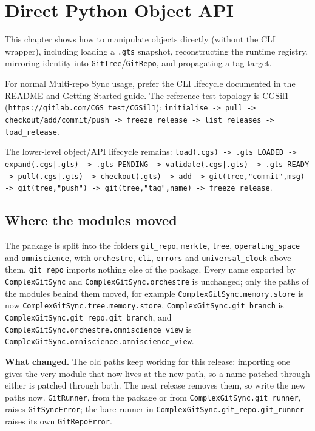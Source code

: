 
\chapter{Direct Python Object API}
\label{chap:python-api}

This chapter shows how to manipulate \cgspkg{} objects directly (without the
CLI wrapper), including loading a \texttt{.gts} snapshot, reconstructing the
runtime registry, mirroring identity into \texttt{GitTree}/\texttt{GitRepo},
and propagating a tag target.

For normal Multi-repo Sync usage, prefer the CLI lifecycle documented in the
README and Getting Started guide. The reference test topology is CGSil1
(\texttt{https://gitlab.com/CGS\_test/CGSil1}):
\texttt{initialise -> pull -> checkout/add/commit/push -> freeze\_release -> list\_releases -> load\_release}.

The lower-level object/API lifecycle remains:
\texttt{load(.cgs) -> .gts LOADED -> expand(.cgs|.gts) -> .gts PENDING ->
validate(.cgs|.gts) -> .gts READY -> pull(.cgs|.gts) -> checkout(.gts) ->
add -> git(tree,"commit",msg) -> git(tree,"push") -> git(tree,"tag",name) ->
freeze\_release}.

\section{Where the modules moved}
\label{sec:module-paths}

The package is split into the folders \texttt{git\_repo}, \texttt{merkle},
\texttt{tree}, \texttt{operating\_space} and \texttt{omniscience}, with
\texttt{orchestre}, \texttt{cli}, \texttt{errors} and \texttt{universal\_clock}
above them. \texttt{git\_repo} imports nothing else of the package. Every name
exported by \texttt{ComplexGitSync} and \texttt{ComplexGitSync.orchestre} is
unchanged; only the paths of the modules behind them moved, for example
\texttt{ComplexGitSync.memory.store} is now
\texttt{ComplexGitSync.tree.memory.store}, \texttt{ComplexGitSync.git\_branch}
is \texttt{ComplexGitSync.git\_repo.git\_branch}, and
\texttt{ComplexGitSync.orchestre.omniscience\_view} is
\texttt{ComplexGitSync.omniscience.omniscience\_view}.

\textbf{What changed.} The old paths keep working for this release: importing
one gives the very module that now lives at the new path, so a name patched
through either is patched through both. The next release removes them, so
write the new paths now. \texttt{GitRunner}, from the package or from
\texttt{ComplexGitSync.git\_runner}, raises \texttt{GitSyncError}; the bare
runner in \texttt{ComplexGitSync.git\_repo.git\_runner} raises its own
\texttt{GitRepoError}.


